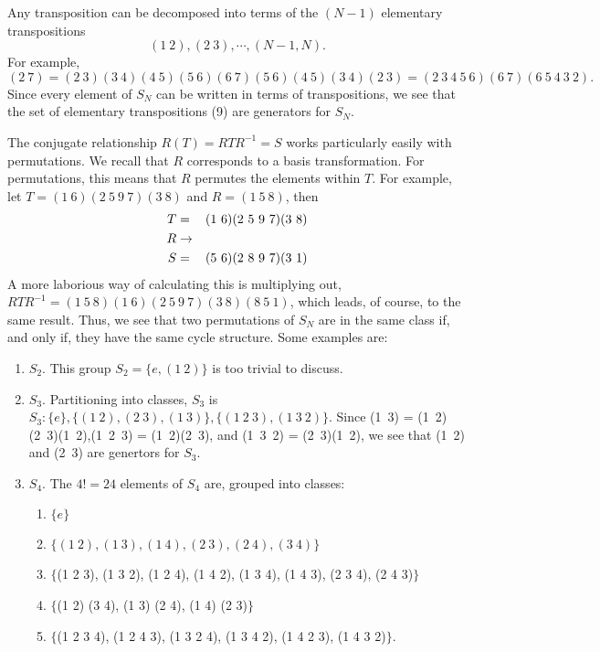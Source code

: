 Any transposition can be decomposed into terms of the $(N-1)$ 
elementary transpositions
\begin{equation}
(1~2) , (2~3), \cdots , (N-1,N).
\label{chap16-eqno9}
\end{equation}
For example,
\begin{equation}
(2~7) = (2~3)(3~4)(4~5)(5~6)(6~7)(5~6)(4~5)(3~4)(2~3) = 
(2~3~4~5~6)(6~7)(6~5~4~3~2).
\end{equation}
Since every element of $S_N$ can be written in terms of 
transpositions, we see that the set of elementary transpositions (9) 
are generators for $S_N$.

The conjugate relationship $R(T)=RTR^{-1}=S$ works particularly easily 
with permutations.  We recall that $R$ corresponds to a basis 
transformation.  For permutations, this means that $R$ permutes the 
elements within $T$.  For example, let $T=(1~6)(2~5~9~7)(3~8)$ and 
$R = (1~5~8)$, then
\begin{eqnarray}
T &=& (1~6)(2~5~9~7)(3~8)\cr
R &\rightarrow &\cr
S &=& (5~6)(2~8~9~7)(3~1)
\end{eqnarray}
A more laborious way of calculating this is multiplying out,
$RTR^{-1} = (1~5~8)(1~6)(2~5~9~7)(3~8)(8~5~1)$,
which leads, of course, to the same result.  Thus, we see that two 
permutations of $S_N$ are in the same class if, and only if, they 
have the same cycle structure.  Some examples are:
\begin{enumerate}
\item $S_2$.  This group $S_2 = \{e,(1~2)\}$ is too trivial to 
discuss.

\item $S_3$.  Partitioning into classes, $S_3$ is 
$S_3:\{e\},\{(1~2),(2~3),(1~3)\},\{(1~2~3),(1~3~2)\}$.   Since 
(1~3) = (1~2)(2~3)(1~2),(1~2~3) = (1~2)(2~3), and (1~3~2) = 
(2~3)(1~2), we see that (1~2) and (2~3) are genertors for $S_3$.

\item $S_4$.  The $4! = 24$ elements of $S_4$ are, grouped into 
classes:
  \begin{enumerate}
    \item $\{e\}$
    \item $\{(1~2),(1~3),(1~4),(2~3),(2~4),(3~4)\}$
    \item $\{$(1 2 3), (1 3 2), (1 2 4), (1 4 2), (1 3 4), (1 4 3), 
      (2 3 4), (2 4 3)$\}$
    \item $\{$(1 2) (3 4), (1 3) (2 4), (1 4) (2 3)$\}$
    \item $\{$(1 2 3 4), (1 2 4 3), (1 3 2 4), (1 3 4 2), (1 4 2 
3), (1 4 3 2)$\}$.
  \end{enumerate}
\end{enumerate}

